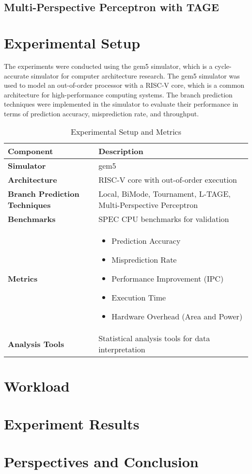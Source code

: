 \documentclass[10pt,journal,compsoc]{IEEEtran}
\begin{document}
\subsection{Multi-Perspective Perceptron with TAGE}
\noindent 

\section{Experimental Setup}\label{experimentalSetup}
The experiments were conducted using the gem5 simulator, which is a cycle-accurate simulator for computer architecture research.\cite{lowepower2020gem5simulatorversion200}
The gem5 simulator was used to model an out-of-order processor with a RISC-V core, which is a common architecture for high-performance computing systems.
The branch prediction techniques were implemented in the simulator to evaluate their performance in terms of prediction accuracy, misprediction rate, and throughput.

\begin{table}[h]
    \centering
    \caption{Experimental Setup and Metrics}
    \begin{tabular}{|>{\centering\arraybackslash}m{2cm}|>{\centering\arraybackslash}m{4cm}|}
        \hline
        \textbf{Component} & \textbf{Description} \\
        \hline
        \textbf{Simulator} & gem5 \\
        \hline
        \textbf{Architecture} & RISC-V core with out-of-order execution \\
        \hline
        \textbf{Branch Prediction Techniques} & Local, BiMode, Tournament, L-TAGE, Multi-Perspective Perceptron \\
        \hline
        \textbf{Benchmarks} & SPEC CPU benchmarks for validation \\
        \hline
        \textbf{Metrics} & \begin{itemize}
            \item Prediction Accuracy
            \item Misprediction Rate
            \item Performance Improvement (IPC)
            \item Execution Time
            \item \raggedright{}Hardware Overhead (Area and Power)
        \end{itemize} \\
        \hline
        \textbf{Analysis Tools} & Statistical analysis tools for data interpretation \\
        \hline
    \end{tabular}
\end{table}


\section{Workload}\label{workload}

\section{Experiment Results}\label{results}

\section{Perspectives and Conclusion}\label{conclusion}

\nocite*{}


\end{document}
